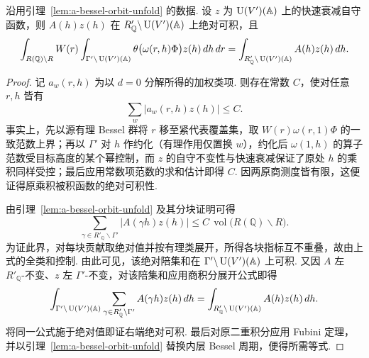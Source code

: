 \begin{lemma}
\label{lem:a-bessel-unfold-integral}
\emitthmsource
沿用引理~\ref{lem:a-bessel-orbit-unfold} 的数据. 设 $z$ 为 $\operatorname{U}(V')(\mathbb A)$ 上的快速衰减自守函数，则 $A(h)z(h)$ 在 $R'_{\mathbb Q}\backslash \operatorname{U}(V')(\mathbb A)$ 上绝对可积，且
\[
 \int_{R(\mathbb Q)\backslash R} W(r)
   \int_{\Gamma'\backslash \operatorname{U}(V')(\mathbb A)}
     \theta\bigl(\omega(r,h)\Phi\bigr)z(h)\,dh\,dr
  =
 \int_{R'_{\mathbb Q}\backslash \operatorname{U}(V')(\mathbb A)}
     A(h)z(h)\,dh .
\]
\end{lemma}
\begin{proof}
记 $a_w(r,h)$ 为以 $d=0$ 分解所得的加权类项. 则存在常数 $C$，使对任意 $r,h$ 皆有
\[
 \sum_w|a_w(r,h)z(h)|\le C.
\]
事实上，先以源有理 Bessel 群将 $r$ 移至紧代表覆盖集，取 $W(r)\omega(r,1)\Phi$ 的一致范数上界；再以 $\Gamma'$ 对 $h$ 作约化（有理作用仅置换 $w$），约化后 $\omega(1,h)$ 的算子范数受目标高度的某个幂控制，而 $z$ 的自守不变性与快速衰减保证了原处 $h$ 的乘积同样受控；最后应用常数项范数的求和估计即得 $C$. 因两原商测度皆有限，这便证得原乘积被积函数的绝对可积性.

由引理~\ref{lem:a-bessel-orbit-unfold} 及其分块证明可得
\[
 \sum_{\gamma\in R'_{\mathbb Q}\backslash\Gamma'}
      |A(\gamma h)z(h)|\le C\,\operatorname{vol}\bigl(R(\mathbb Q)\backslash R\bigr).
\]
为证此界，对每块贡献取绝对值并按有理类展开，所得各块指标互不重叠，故由上式的全类和控制. 由此可见，该绝对陪集和在 $\Gamma'\backslash \operatorname{U}(V')(\mathbb A)$ 上可积. 又因 $A$ 左 $R'_{\mathbb Q}$-不变、$z$ 左 $\Gamma'$-不变，对该陪集和应用商积分展开公式即得
\[
 \int_{\Gamma'\backslash \operatorname{U}(V')(\mathbb A)}
      \sum_{\gamma\in R'_{\mathbb Q}\backslash\Gamma'}A(\gamma h)z(h)\,dh
 = \int_{R'_{\mathbb Q}\backslash \operatorname{U}(V')(\mathbb A)}A(h)z(h)\,dh .
\]
将同一公式施于绝对值即证右端绝对可积. 最后对原二重积分应用 Fubini 定理，并以引理~\ref{lem:a-bessel-orbit-unfold} 替换内层 Bessel 周期，便得所需等式.
\end{proof}

